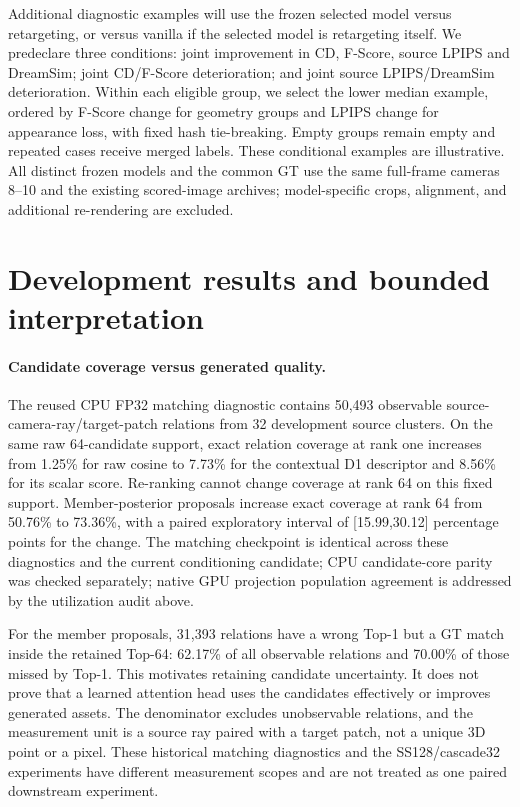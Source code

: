\documentclass[10pt]{article}
\begin{document}
Additional diagnostic examples will use the frozen selected model versus
retargeting, or versus vanilla if the selected model is retargeting itself.
We predeclare three conditions: joint improvement in CD, F-Score, source
LPIPS and DreamSim; joint CD/F-Score deterioration; and joint source
LPIPS/DreamSim deterioration. Within each eligible group, we select the
lower median example, ordered by F-Score change for geometry groups and
LPIPS change for appearance loss, with fixed hash tie-breaking. Empty groups
remain empty and repeated cases receive merged labels. These conditional
examples are illustrative. All distinct frozen models and the common GT
use the same full-frame cameras 8--10 and the existing scored-image archives;
model-specific crops, alignment, and additional re-rendering are excluded.

\section{Development results and bounded interpretation}




\paragraph{Candidate coverage versus generated quality.}
The reused CPU FP32 matching diagnostic contains 50,493 observable
source-camera-ray/target-patch relations from 32 development source clusters.
On the same raw 64-candidate support, exact relation coverage at rank one
increases from 1.25\% for raw cosine to 7.73\% for the contextual D1 descriptor
and 8.56\% for its scalar score. Re-ranking cannot change coverage at rank 64
on this fixed support. Member-posterior proposals increase exact coverage at
rank 64 from 50.76\% to 73.36\%, with a paired exploratory interval of
[15.99,30.12] percentage points for the change. The matching checkpoint is
identical across these diagnostics and the current conditioning candidate;
CPU candidate-core parity was checked separately; native GPU projection
population agreement is addressed by the utilization audit above.

For the member proposals, 31,393 relations have a wrong Top-1 but a GT match
inside the retained Top-64: 62.17\% of all observable relations and 70.00\% of
those missed by Top-1. This motivates retaining candidate uncertainty. It does
not prove that a learned attention head uses the candidates effectively or
improves generated assets. The denominator excludes unobservable relations,
and the measurement unit is a source ray paired with a target patch, not a
unique 3D point or a pixel. These historical matching diagnostics and the
SS128/cascade32 experiments have different measurement scopes and are not
treated as one paired downstream experiment.
\end{document}
